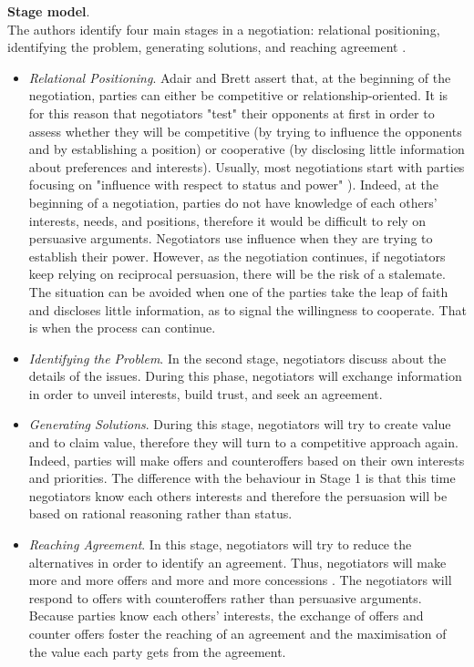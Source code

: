 \documentclass[../main.tex]{subfiles}
\begin{document}
\textbf{Stage model}.\\
The authors identify four main stages in a negotiation: relational positioning, identifying the problem, generating solutions, and reaching agreement \mancite\autocite[34]{adair}. 
\begin{itemize}
    \item \textit{Relational Positioning}. Adair and Brett assert that, at the beginning of the negotiation, parties can either be competitive or relationship-oriented. It is for this reason that negotiators "test" their opponents at first in order to assess whether they will be competitive (by trying to influence the opponents and by establishing a position) or cooperative (by disclosing little information about preferences and interests). Usually, most negotiations start with parties focusing on "influence with respect to status and power" \mancite\autocite[36]{adair}). Indeed, at the beginning of a negotiation, parties do not have knowledge of each others' interests, needs, and positions, therefore it would be difficult to rely on persuasive arguments. Negotiators use influence when they are trying to establish their power. However, as the negotiation continues, if negotiators keep relying on reciprocal persuasion, there will be the risk of a stalemate. The situation can be avoided when one of the parties take the leap of faith and discloses little information, as to signal the willingness to cooperate. That is when the process can continue.
    \item \textit{Identifying the Problem}. In the second stage, negotiators discuss about the details of the issues. During this phase, negotiators will exchange information in order to unveil interests, build trust, and seek an agreement.
    \item \textit{Generating Solutions}. During this stage, negotiators will try to create value and to claim value, therefore they will turn to a competitive approach again. Indeed, parties will make offers and counteroffers based on their own interests and priorities. The difference with the behaviour in Stage 1 is that this time negotiators know each others interests and therefore the persuasion will be based on rational reasoning rather than status.
    \item \textit{Reaching Agreement}. In this stage, negotiators will try to reduce the alternatives in order to identify an agreement. Thus, negotiators will make more and more offers and more and more concessions \mancite\autocite[37]{adair}. The negotiators will respond to offers with counteroffers rather than persuasive arguments. Because parties know each others' interests, the exchange of offers and counter offers foster the reaching of an agreement and the maximisation of the value each party gets from the agreement.
\end{itemize}
\end{document}
